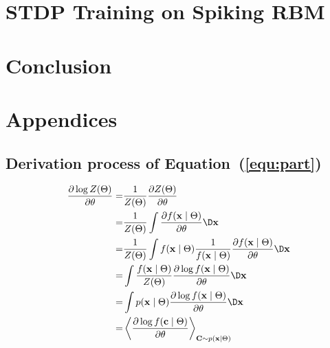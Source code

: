 	
	
\section{STDP Training on Spiking RBM}	

\section{Conclusion}

	
\section{Appendices}
		\subsection{Derivation process of Equation~(\ref{equ:part})}
		\label{app:part}
		\begin{equation}
		\begin{aligned}
		\dfrac{\partial \log Z(\Theta)}{\partial \theta}
		=&\frac{1}{Z(\Theta)}\dfrac{\partial Z(\Theta)}{\partial \theta}\\
		=&\frac{1}{Z(\Theta)} \int \dfrac{\partial f(\mathbf{x} \mid \Theta)}{\partial \theta} \D \mathbf{x} \\
		=&\frac{1}{Z(\Theta)} \int f(\mathbf{x} \mid \Theta) \frac{1}{f(\mathbf{x} \mid \Theta)} \dfrac{\partial  f(\mathbf{x} \mid \Theta)}{\partial \theta} \D \mathbf{x}\\
		=& \int \frac{f(\mathbf{x} \mid \Theta) }{Z(\Theta)} \dfrac{\partial \log f(\mathbf{x} \mid \Theta)}{\partial \theta} \D \mathbf{x}\\
		=& \int  p(\mathbf{x} \mid \Theta) \dfrac{\partial \log f(\mathbf{x} \mid \Theta)}{\partial \theta} \D \mathbf{x}\\
		=&\left \langle \dfrac{\partial \log f(\mathbf{c} \mid \Theta)}{\partial \theta}\right \rangle_{\mathbf{C} \sim p(\mathbf{x} \mid \Theta)}
		\end{aligned}
		\end{equation}
